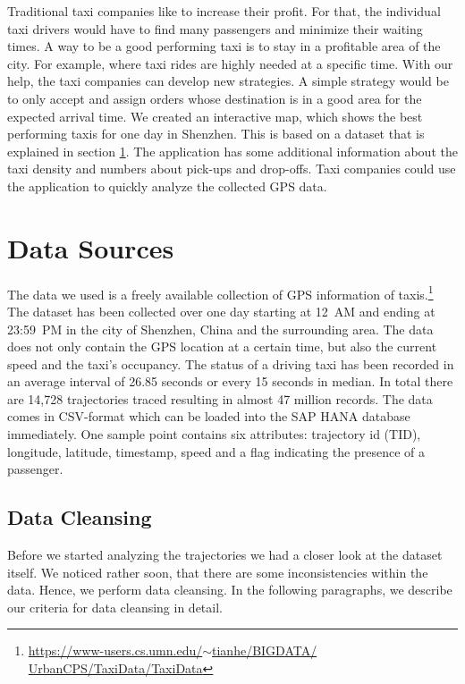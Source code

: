 \documentclass[10pt]{sig-alternate}
\begin{document}
Traditional taxi companies like to increase their profit. For that, the individual taxi drivers would have to find many passengers and minimize their waiting times. A way to be a good performing taxi is to stay in a profitable area of the city. For example, where taxi rides are highly needed at a specific time. With our help, the taxi companies can develop new strategies. A simple strategy would be to only accept and assign orders whose destination is in a good area for the expected arrival time. We created an interactive map, which shows the best performing taxis for one day in Shenzhen. This is based on a dataset that is explained in section \ref{sec:ds}. The application has some additional information about the taxi density and numbers about pick-ups and drop-offs. Taxi companies could use the application to quickly analyze the collected GPS data.

\section{Data Sources}
\label{sec:ds}

The data we used is a freely available collection of GPS information of taxis.\footnote{\href{https://www-users.cs.umn.edu/~tianhe/BIGDATA/UrbanCPS/TaxiData/TaxiData}{https://www-users.cs.umn.edu/$\sim$tianhe/BIGDATA/\\UrbanCPS/TaxiData/TaxiData}} The dataset has been collected over one day starting at 12~AM and ending at 23:59~PM in the city of Shenzhen, China and the surrounding area. The data does not only contain the GPS location at a certain time, but also the current speed and the taxi's occupancy. The status of a driving taxi has been recorded in an average interval of 26.85 seconds or every 15 seconds in median. In total there are 14,728 trajectories traced resulting in almost 47 million records. The data comes in CSV-format which can be loaded into the SAP HANA database immediately. One sample point contains six attributes: trajectory id (TID), longitude, latitude, timestamp, speed and a flag indicating the presence of a passenger.

\subsection{Data Cleansing}
Before we started analyzing the trajectories we had a closer look at the dataset itself. We noticed rather soon, that there are some inconsistencies within the data. Hence, we perform data cleansing. In the following paragraphs, we describe our criteria for data cleansing in detail.
\end{document}
